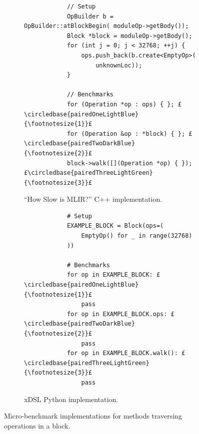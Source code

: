\begin{figure}[H]
    \centering
    \begin{subfigure}[b]{0.45\textwidth}
       \centering
        \begin{verbatim}
            // Setup
            OpBuilder b = OpBuilder::atBlockBegin( moduleOp->getBody());
            Block *block = moduleOp->getBody();
            for (int j = 0; j < 32768; ++j) {
                ops.push_back(b.create<EmptyOp>(
                    unknownLoc));
            }

            // Benchmarks
            for (Operation *op : ops) { }; £\circledbase{pairedOneLightBlue}{\footnotesize{1}}£
            for (Operation &op : *block) { }; £\circledbase{pairedTwoDarkBlue}{\footnotesize{2}}£
            block->walk([](Operation *op) { }); £\circledbase{pairedThreeLightGreen}{\footnotesize{3}}£
        \end{verbatim}
        \caption{``How Slow is MLIR?'' C++ implementation.}
        \label{listing:ubenchmark-op-traversal-bench-mlir}
    \end{subfigure}
    \hfill
    \begin{subfigure}[b]{0.45\textwidth}
        \centering
        \begin{verbatim}
            # Setup
            EXAMPLE_BLOCK = Block(ops=(
                EmptyOp() for _ in range(32768)
            ))

            # Benchmarks
            for op in EXAMPLE_BLOCK: £\circledbase{pairedOneLightBlue}{\footnotesize{1}}£
                pass
            for op in EXAMPLE_BLOCK.ops: £\circledbase{pairedTwoDarkBlue}{\footnotesize{2}}£
                pass
            for op in EXAMPLE_BLOCK.walk(): £\circledbase{pairedThreeLightGreen}{\footnotesize{3}}£
                pass
        \end{verbatim}
        \footnotesize\vspace{1em}
        \caption{xDSL Python implementation.}
        \label{listing:ubenchmark-op-traversal-bench-xdsl}
    \end{subfigure}
    \vspace{1em}
    \captionsetup{name=Listing}
    \caption{Micro-benchmark implementations for methods traversing operations in a block.}
    \label{listing:ubenchmark-op-traversal-bench}
\end{figure}



